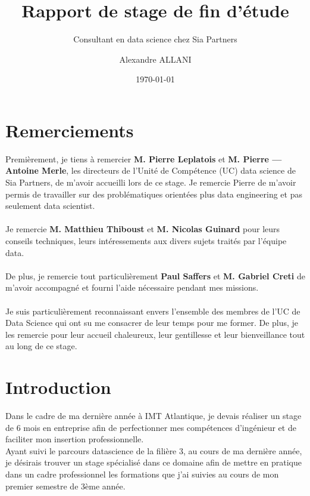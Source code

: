 \documentclass{article} %
\author{Alexandre ALLANI}
\date{\noexpand\today} %
\title{Rapport de stage de fin d'étude}
\subtitle{Consultant en data science chez Sia Partners}
\begin{document}
\imtaMaketitlepage

\section{Remerciements}
Premièrement, je tiens à remercier \textbf{M. Pierre Leplatois} et \textbf{M. Pierre — Antoine
Merle}, les directeurs de l’Unité de Compétence (UC) data science de Sia Partners, de
m’avoir accueilli lors de ce stage. Je remercie Pierre de m'avoir permis de travailler sur des problématiques orientées plus data engineering et pas seulement data scientist.
\\ \\

Je remercie \textbf{M. Matthieu Thiboust} et \textbf{M. Nicolas Guinard}  pour leurs conseils techniques, leurs intéressements aux divers sujets traités par l’équipe data.
\\ \\

De plus, je remercie tout particulièrement \textbf{Paul Saffers} et \textbf{M. Gabriel Creti} de m'avoir accompagné et fourni l'aide nécessaire pendant mes missions. 
\\ \\

Je suis particulièrement reconnaissant envers l’ensemble des membres de l’UC de Data Science qui ont su me consacrer de leur temps pour me former. De plus, je les remercie pour leur accueil chaleureux, leur gentillesse et leur bienveillance tout au long de ce stage.

\newpage

\tableofcontents


\newpage


\section{Introduction}

Dans le cadre de ma dernière année à IMT Atlantique, je devais réaliser un stage
de 6 mois en entreprise afin de perfectionner mes compétences d’ingénieur et de
faciliter mon insertion professionnelle.\\

Ayant suivi le parcours datascience de la filière 3, au cours de ma dernière année, je désirais trouver un stage spécialisé dans ce domaine afin de mettre en pratique dans un cadre professionnel les formations que j’ai suivies au cours de mon premier semestre de 3ème année.\\
\end{document}
